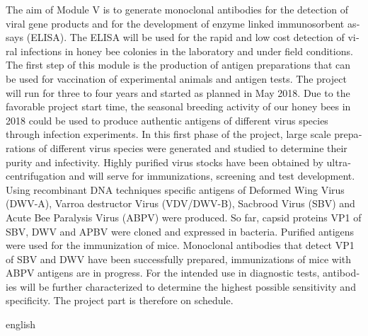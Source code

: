 \begin{otherlanguage}{english}
The aim of Module V is to generate monoclonal antibodies for the detection of viral gene products and for the development of enzyme linked immunosorbent assays (ELISA). The ELISA will be used for the rapid and low cost detection of viral infections in honey bee colonies in the laboratory and under field conditions. The first step of this module is the production of antigen preparations that can be used for vaccination of experimental animals and antigen tests. The project will run for three to four years and started as planned in May 2018. Due to the favorable project start time, the seasonal breeding activity of our honey bees in 2018 could be used to produce authentic antigens of different virus species through infection experiments. In this first phase of the project, large scale preparations of different virus species were generated and studied to determine their purity and infectivity. Highly purified virus stocks have been obtained by ultracentrifugation and will serve for immunizations, screening and test development. Using recombinant DNA techniques specific antigens of Deformed Wing Virus (DWV-A), Varroa destructor Virus (VDV/DWV-B), Sacbrood Virus (SBV) and Acute Bee Paralysis Virus (ABPV) were produced. So far, capsid proteins VP1 of SBV, DWV and APBV were cloned and expressed in bacteria. Purified antigens were used for the immunization of mice. Monoclonal antibodies that detect VP1 of SBV and DWV have been successfully prepared, immunizations of mice with ABPV antigens are in progress.  For the intended use in diagnostic tests, antibodies will be further characterized to determine the highest possible sensitivity and specificity.
The project part is therefore on schedule.
\end{otherlanguage}{english}
